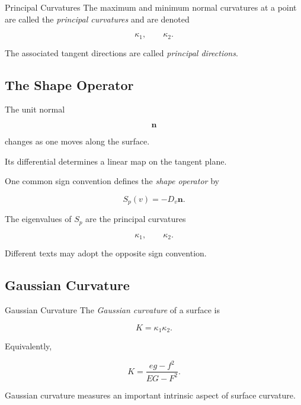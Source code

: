 \begin{definitionbox}{Principal Curvatures}
The maximum and minimum normal curvatures at a point are called the
\emph{principal curvatures} and are denoted

\[
\boxed{
\kappa_1,\qquad\kappa_2.
}
\]
\end{definitionbox}

The associated tangent directions are called \emph{principal directions}.

\subsection{The Shape Operator}
\label{subsec:shape-operator}

The unit normal

\[
\mathbf{n}
\]

changes as one moves along the surface.

Its differential determines a linear map on the tangent plane.

One common sign convention defines the \emph{shape operator} by

\[
\boxed{
S_p(v)=-D_v\mathbf{n}.
}
\]

The eigenvalues of \(S_p\) are the principal curvatures

\[
\boxed{
\kappa_1,\qquad\kappa_2.
}
\]

Different texts may adopt the opposite sign convention.

\subsection{Gaussian Curvature}
\label{subsec:gaussian-curvature}

\begin{definitionbox}{Gaussian Curvature}
The \emph{Gaussian curvature} of a surface is

\[
\boxed{
K=\kappa_1\kappa_2.
}
\]
\end{definitionbox}

Equivalently,

\[
\boxed{
K
=
\frac{eg-f^2}
{EG-F^2}.
}
\]

Gaussian curvature measures an important intrinsic aspect of surface
curvature.

